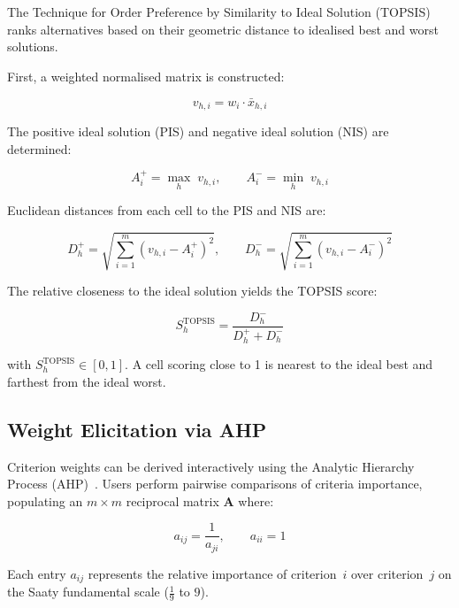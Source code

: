 The Technique for Order Preference by Similarity to Ideal Solution (TOPSIS)~\cite{hwang1981topsis} ranks alternatives based on their geometric distance to idealised best and worst solutions.

First, a weighted normalised matrix is constructed:

\begin{equation}
v_{h,i} = w_i \cdot \bar{x}_{h,i}
\end{equation}

\noindent The positive ideal solution (PIS) and negative ideal solution (NIS) are determined:

\begin{equation}
A^{+}_i = \max_{h} \; v_{h,i}, \qquad
A^{-}_i = \min_{h} \; v_{h,i}
\end{equation}

\noindent Euclidean distances from each cell to the PIS and NIS are:

\begin{equation}
D_h^{+} = \sqrt{\sum_{i=1}^{m} (v_{h,i} - A^{+}_i)^2}, \qquad
D_h^{-} = \sqrt{\sum_{i=1}^{m} (v_{h,i} - A^{-}_i)^2}
\end{equation}

\noindent The relative closeness to the ideal solution yields the TOPSIS score:

\begin{equation}
\label{eq:topsis}
S_h^{\text{TOPSIS}} = \frac{D_h^{-}}{D_h^{+} + D_h^{-}}
\end{equation}

\noindent with $S_h^{\text{TOPSIS}} \in [0,1]$. A cell scoring close to 1 is nearest to the ideal best and farthest from the ideal worst.

\subsection{Weight Elicitation via AHP}
\label{sec:ahp}

Criterion weights can be derived interactively using the Analytic Hierarchy Process (AHP)~\cite{saaty1980ahp}. Users perform pairwise comparisons of criteria importance, populating an $m \times m$ reciprocal matrix $\mathbf{A}$ where:

\begin{equation}
a_{ij} = \frac{1}{a_{ji}}, \qquad a_{ii} = 1
\end{equation}

\noindent Each entry $a_{ij}$ represents the relative importance of criterion~$i$ over criterion~$j$ on the Saaty fundamental scale ($\tfrac{1}{9}$ to $9$).

